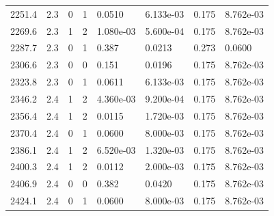 \documentclass[preview]{standalone}
\begin{document}
{{{{{\begin{tabular}{L{1.2cm}C{1.2cm} C{0.3cm}C{0.5cm} C{1.4cm}C{1.4cm} C{1.4cm}C{1.4cm}}
  2251.4  &   2.3  & 0     &  1 &  0.0510  & 6.133e-03  & 0.175 &  8.762e-03   \\ 
  2269.6  &   2.3  & 1     &  2 &  1.080e-03  & 5.600e-04  & 0.175 &  8.762e-03   \\ 
  2287.7  &   2.3  & 0     &  1 &  0.387  & 0.0213  & 0.273 &  0.0600   \\ 
  2306.6  &   2.3  & 0     &  0 &  0.151  & 0.0196  & 0.175 &  8.762e-03   \\ 
  2323.8  &   2.3  & 0     &  1 &  0.0611  & 6.133e-03  & 0.175 &  8.762e-03   \\ 
  2346.2  &   2.4  & 1     &  2 &  4.360e-03  & 9.200e-04  & 0.175 &  8.762e-03   \\ 
  2356.4  &   2.4  & 1     &  2 &  0.0115  & 1.720e-03  & 0.175 &  8.762e-03   \\ 
  2370.4  &   2.4  & 0     &  1 &  0.0600  & 8.000e-03  & 0.175 &  8.762e-03   \\ 
  2386.1  &   2.4  & 1     &  2 &  6.520e-03  & 1.320e-03  & 0.175 &  8.762e-03   \\ 
  2400.3  &   2.4  & 1     &  2 &  0.0112  & 2.000e-03  & 0.175 &  8.762e-03   \\ 
  2406.9  &   2.4  & 0     &  0 &  0.382  & 0.0420  & 0.175 &  8.762e-03   \\ 
  2424.1  &   2.4  & 0     &  1 &  0.0600  & 8.000e-03  & 0.175 &  8.762e-03   \\ 
\hline 
\end{tabular} 

}}}}}
\end{document}
